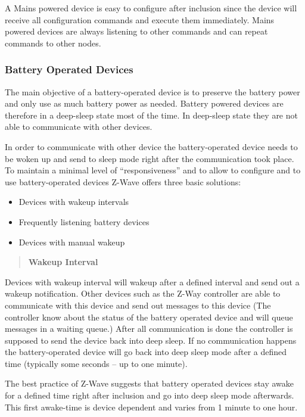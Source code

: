 A Mains powered device is easy to configure after inclusion since the device will receive all configuration commands and execute them immediately. 
 Mains powered devices are always listening to other commands and can repeat commands to other nodes. 

\subsubsection{Battery Operated Devices}

The main objective of a battery-operated device is to preserve the battery power and only use as much battery power as needed.  Battery powered devices 
 are therefore in a deep-sleep state most of the time. In deep-sleep state they are not able to communicate with other devices. 

In order to communicate with other device the battery-operated device needs to be woken up and send to sleep mode right after the communication 
 took place. To maintain a minimal level of “responsiveness” and to allow to configure and to use battery-operated devices Z-Wave offers three basic solutions:
\begin{itemize}
\item	Devices with wakeup intervals
\item Frequently listening battery devices 
\item Devices with manual wakeup
\end{itemize}

\begin{quote}

{\bf Wakeup Interval}
\end{quote}
Devices with wakeup interval will wakeup after a defined interval and send out a wakeup notification. Other devices such as the Z-Way controller are 
able to communicate with this device and send out messages to this device (The controller know about the status of the battery operated device and will 
queue messages in a waiting queue.) After all communication is done the controller is supposed to send the device back into deep sleep.
If no communication happens the battery-operated device will go back into deep sleep mode after a defined time (typically some seconds – up to one minute).

The best practice of Z-Wave suggests that battery operated devices stay awake for a defined time right after inclusion and go into deep sleep mode 
afterwards. This first awake-time is device dependent and varies from 1 minute to one hour.


